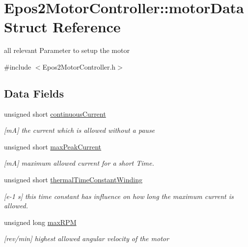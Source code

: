 \hypertarget{structEpos2MotorController_1_1motorData}{\section{Epos2\-Motor\-Controller\-:\-:motor\-Data Struct Reference}
\label{structEpos2MotorController_1_1motorData}
}


all relevant Parameter to setup the motor  




{\ttfamily \#include $<$Epos2\-Motor\-Controller.\-h$>$}

\subsection*{Data Fields}
\begin{DoxyCompactItemize}
\item 
\hypertarget{structEpos2MotorController_1_1motorData_a5762e10b4a0852447d06485c3ded9734}{unsigned short \hyperlink{structEpos2MotorController_1_1motorData_a5762e10b4a0852447d06485c3ded9734}{continuous\-Current}}\label{structEpos2MotorController_1_1motorData_a5762e10b4a0852447d06485c3ded9734}

\begin{DoxyCompactList}\small\item\em \mbox{[}m\-A\mbox{]} the current which is allowed without a pause \end{DoxyCompactList}\item 
unsigned short \hyperlink{structEpos2MotorController_1_1motorData_a44b2f3a2b69c0d354865934df1aa9b26}{max\-Peak\-Current}
\begin{DoxyCompactList}\small\item\em \mbox{[}m\-A\mbox{]} maximum allowed current for a short Time. \end{DoxyCompactList}\item 
unsigned short \hyperlink{structEpos2MotorController_1_1motorData_a97bb3cd026f3bd970ded43a91ed3a5cc}{thermal\-Time\-Constant\-Winding}
\begin{DoxyCompactList}\small\item\em \mbox{[}e-\/1 s\mbox{]} this time constant has influence on how long the maximum current is allowed. \end{DoxyCompactList}\item 
\hypertarget{structEpos2MotorController_1_1motorData_ab56ae3a7cdd5f9ac4d1e5581a95f3098}{unsigned long \hyperlink{structEpos2MotorController_1_1motorData_ab56ae3a7cdd5f9ac4d1e5581a95f3098}{max\-R\-P\-M}}\label{structEpos2MotorController_1_1motorData_ab56ae3a7cdd5f9ac4d1e5581a95f3098}

\begin{DoxyCompactList}\small\item\em \mbox{[}rev/min\mbox{]} highest allowed angular velocity of the motor \end{DoxyCompactList}\end{DoxyCompactItemize}
